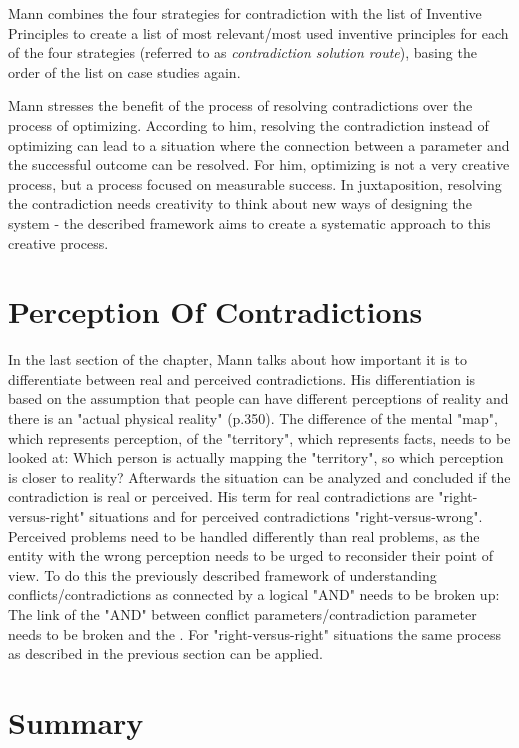 \documentclass{article}
\begin{document}
Mann combines the four strategies for contradiction with the list of Inventive Principles to create a list of most relevant/most used inventive principles for each of the four strategies (referred to as \textit{contradiction solution route}), basing the order of the list on case studies again.

Mann stresses the benefit of the process of resolving contradictions over the process of optimizing. According to him, resolving the contradiction instead of optimizing can lead to a situation where the connection between a parameter and the successful outcome can be resolved. For him, optimizing is not a very creative process, but a process focused on measurable success. In juxtaposition, resolving the contradiction needs creativity to think about new ways of designing the system - the described framework aims to create a systematic approach to this creative process. 

\section{Perception Of Contradictions}

In the last section of the chapter, Mann talks about how important it is to differentiate between real and perceived contradictions. His differentiation is based on the assumption that people can have different perceptions of reality and there is an "actual physical reality" (p.350). The difference of the mental "map", which represents perception, of the "territory", which represents facts, needs to be looked at: Which person is actually mapping the "territory", so which perception is closer to reality? Afterwards the situation can be analyzed and concluded if the contradiction is real or perceived. His term for real contradictions are "right-versus-right" situations and for perceived contradictions "right-versus-wrong". Perceived problems need to be handled differently than real problems, as the entity with the wrong perception needs to be urged to reconsider their point of view. To do this the previously described framework of understanding conflicts/contradictions as connected by a logical "AND" needs to be broken up: The link of the "AND" between conflict parameters/contradiction parameter needs to be broken and the . For "right-versus-right" situations the same process as described in the previous section can be applied.

\section{Summary}
\end{document}
